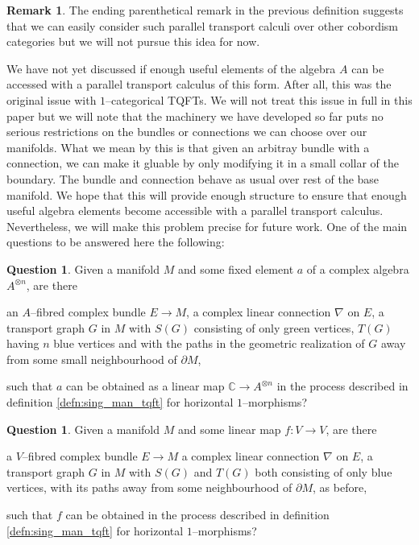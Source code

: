 \documentclass{amsart}
\newcommand{\C}{\mathbb{C}}
\newcommand{\tensor}{\otimes}
\renewcommand{\to}[1][]{\stackrel{#1}{\longrightarrow}}
\newcommand{\li}[1][]{\ifthenelse{\equal{#1}{}}{\item}{\item \label{#1}}}
\newenvironment{enmrt}{
  \enumerate[(i)]
  \setlength{\itemsep}{0pt}
}{
  \endenumerate
}
\numberwithin{thm}{section}
\theoremstyle{definition}
\newtheorem{rmk}[thm]{Remark}
\newtheorem{qstn}[thm]{Question}
\begin{document}
\begin{rmk}
The ending parenthetical remark in the previous definition suggests that we can
easily consider such parallel transport calculi over other cobordism categories
but we will not pursue this idea for now.
\end{rmk}

We have not yet discussed if enough useful elements of the algebra $A$ can be
accessed with a parallel transport calculus of this form.
After all, this was the original
issue with $1$--categorical TQFTs. We will not treat this issue in full in this
paper but we will note that the machinery we have developed so far puts no
serious restrictions on the bundles or connections we can choose over our
manifolds. What we mean by this is that given an arbitray bundle with a
connection, we can make it gluable by only modifying it in a small collar of the
boundary. The bundle and connection behave as usual over rest of the base
manifold. We hope that this will provide enough structure to ensure that enough
useful algebra elements become accessible with a parallel transport calculus.
Nevertheless, we will make this problem precise for future work.
One of the main questions to be answered here the following:

\begin{qstn}\label{qstn:elem_from_pt}
Given a manifold $M$ and some fixed element $a$ of a complex algebra
$A^{\tensor n}$, are there
\begin{enmrt}
\li an $A$--fibred complex bundle $E \to M$,
\li a complex linear connection $\nabla$ on $E$,
\li a transport graph $G$ in $M$ with $S(G)$ consisting of only green vertices,
$T(G)$ having $n$ blue vertices and with the paths in the geometric realization
of $G$ away from some small neighbourhood of $\partial M$,
\end{enmrt}
such that $a$ can be obtained as a linear map $\C \to A^{\tensor n}$ in
the process described in definition \ref{defn:sing_man_tqft} for horizontal
$1$--morphisms?
\end{qstn}

\begin{qstn}\label{qstn:map_from_pt}
Given a manifold $M$ and some linear map $f : V \to V$, are there
\begin{enmrt}
\li a $V$--fibred complex bundle $E \to M$
\li a complex linear connection $\nabla$ on $E$,
\li a transport graph $G$ in $M$ with $S(G)$ and $T(G)$ both consisting of only
blue vertices, with its paths away from some neighbourhood of $\partial M$, as
before,
\end{enmrt}
such that $f$ can be obtained in the process described in definition
\ref{defn:sing_man_tqft} for horizontal $1$--morphisms?
\end{qstn}
\end{document}
